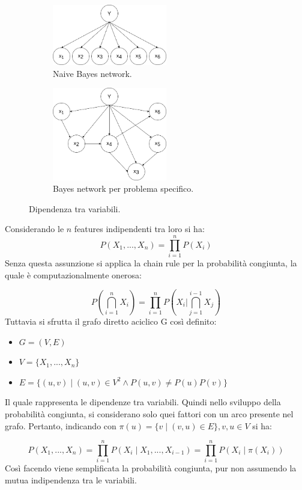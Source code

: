 \documentclass[oneside]{book}
\begin{document}
\begin{figure}[!h]
	\centering
	\begin{subfigure}[b]{0.4\textwidth}
		\centering
		\includegraphics[width=5cm]{assets/naive-bayes.png}
		\caption{Naive Bayes network.}
		\label{fig:naive-bayes}
	\end{subfigure}
	\hspace{4em}
	\begin{subfigure}[b]{0.4\textwidth}
	\centering
		\includegraphics[width=5cm]{assets/bayes-network.png}
		\caption{Bayes network per problema specifico.}
		\label{fig:naive-bayes}
	\end{subfigure}
	\caption{Dipendenza tra variabili.}
\end{figure}
\noindent Considerando le $n$ features indipendenti tra loro si ha:
$$P(X_1, ..., X_n) = \prod\limits_{i=1}^{n}P(X_i) $$
Senza questa assunzione si applica la chain rule per la probabilità congiunta, la quale è computazionalmente onerosa:

\[ 
P \left( \bigcap_{i=1}^n X_i \right) = 
\prod\limits_{i=1}^{n}P
\left( X_i  \bigg\vert
\bigcap_{j=1}^{i-1} X_j \right)
\]
Tuttavia si sfrutta il grafo diretto aciclico G così definito:
\begin{itemize}
	\item $G = (V, E)$
	\item $V = \{X_1, ..., X_n\}$
	\item $E = \{(u,v) \mid (u,v) \in V^2 \land P(u, v) \neq P(u)P(v) \}$
\end{itemize}
Il quale rappresenta le dipendenze tra variabili. Quindi nello sviluppo della probabilità congiunta, si considerano solo quei fattori con un arco presente nel grafo. Pertanto, indicando con $\pi(u) = \{v \mid (v, u) \in E\}, v,u \in V$ si ha:


$$P(X_1, ..., X_n) = \prod\limits_{i=1}^{n}P(X_i \mid X_1, ..., X_{i-1}) = \prod\limits_{i=1}^{n}P(X_i \mid \pi(X_i)) $$
Così facendo viene semplificata la probabilità congiunta, pur non assumendo la mutua indipendenza tra le variabili.
\end{document}
